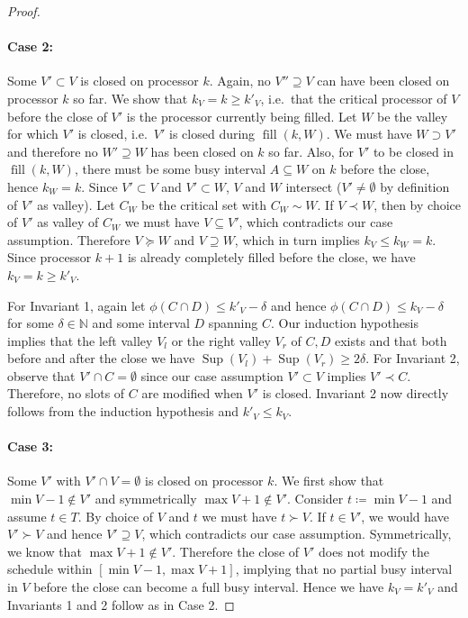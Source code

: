 \documentclass[a4paper]{article}
\DeclareMathOperator{\fillop}{fill}
\DeclareMathOperator{\res}{Sup}
\begin{document}
\begin{proof}
  \paragraph{Case 2:}\label{case:2}
      Some $V' \subset V$ is closed on processor $k$.
      Again, no $V'' \supseteq V$ can have been closed on processor $k$ so far.
      We show that $k_V = k \geq k'_V$, i.e.\ that the critical processor of $V$ before the close of $V'$ is the processor currently being filled.
      Let $W$ be the valley for which $V'$ is closed, i.e.\ $V'$ is closed during $\fillop(k, W)$.
      We must have $W \supset V'$ and therefore no $W' \supseteq W$ has been closed on $k$ so far.
      Also, for $V'$ to be closed in $\fillop(k, W)$, there must be some busy interval $A \subseteq W$ on $k$ before the close, hence $k_W = k$.
      Since $V' \subset V$ and $V' \subset W$, $V$ and $W$ intersect ($V' \neq \emptyset$ by definition of $V'$ as valley).
      Let $C_W$ be the critical set with $C_W \sim W$.
      If $V \prec W$, then by choice of $V'$ as valley of $C_W$ we must have $V \subseteq V'$, which contradicts our case assumption.
      Therefore $V \succeq W$ and $V \supseteq W$, which in turn implies $k_V \leq k_W = k$.
      Since processor $k+1$ is already completely filled before the close, we have $k_V = k \geq k'_V$.

      For Invariant 1, again let $\phi(C \cap D) \leq k'_V - \delta$ and hence $\phi(C \cap D) \leq k_V - \delta$ for some $\delta \in \mathbb{N}$ and some interval $D$ spanning $C$.
      Our induction hypothesis implies that the left valley $V_l$ or the right valley $V_r$ of $C, D$ exists and that both before and after the close we have $\res(V_l) + \res(V_r) \geq 2 \delta$.
      For Invariant 2, observe that $V' \cap C = \emptyset$ since our case assumption $V' \subset V$ implies $V' \prec C$.
      Therefore, no slots of $C$ are modified when $V'$ is closed.
      Invariant 2 now directly follows from the induction hypothesis and $k'_V \leq k_V$.


  \paragraph{Case 3:}
      Some $V'$ with $V' \cap V = \emptyset$ is closed on processor $k$.
      We first show that $\min V - 1 \notin V'$ and symmetrically $\max V + 1 \notin V'$.
      Consider $t \coloneqq \min V - 1$ and assume $t \in T$.
      By choice of $V$ and $t$ we must have $t \succ V$.
      If $t \in V'$, we would have $V' \succ V$ and hence $V' \supseteq V$, which contradicts our case assumption.
      Symmetrically, we know that $\max V + 1 \notin V'$.
      Therefore the close of $V'$ does not modify the schedule within $[\min V - 1, \max V + 1]$, implying that no partial busy interval in $V$ before the close can become a full busy interval.
      Hence we have $k_V = k'_V$ and Invariants 1 and 2 follow as in Case 2.


\end{proof}
\end{document}
